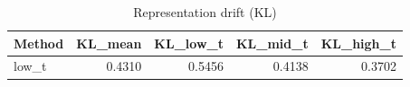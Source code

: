\begin{table}[htbp]
\centering
\caption{Representation drift (KL)}
\label{tab:repr-drift}
\begin{tabular}{lrrrr}
\toprule
\textbf{Method} & \textbf{KL\_mean} & \textbf{KL\_low\_t} & \textbf{KL\_mid\_t} & \textbf{KL\_high\_t} \\
\midrule
low\_t & 0.4310 & 0.5456 & 0.4138 & 0.3702 \\
\bottomrule
\end{tabular}
\end{table}